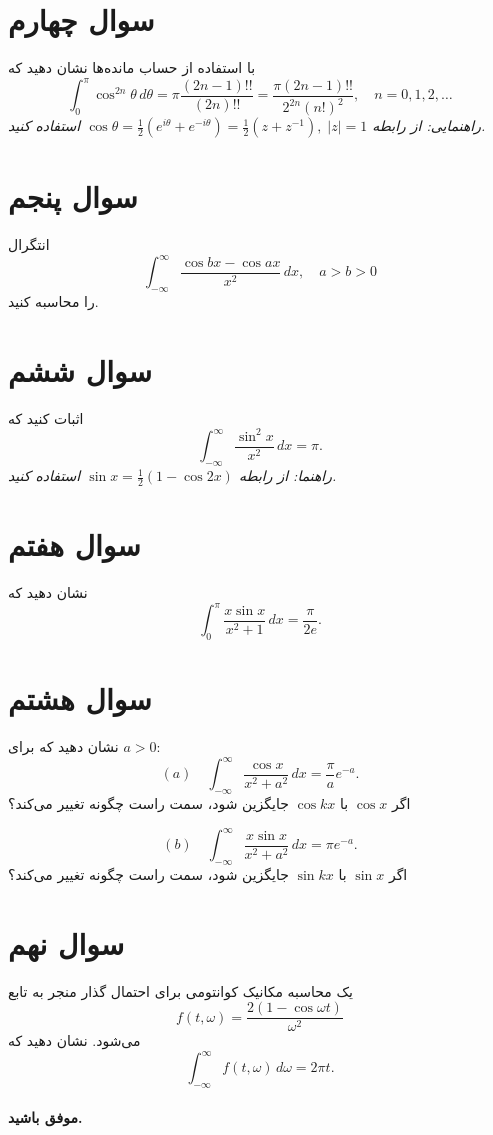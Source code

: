 \documentclass[a4paper,16pt]{article}
\begin{document}
	\section{سوال چهارم}
	
	با استفاده از حساب مانده‌ها نشان دهید که
	\[
	\int_0^\pi \cos^{2n} \theta\, d\theta = \pi \frac{(2n-1)!!}{(2n)!!} = \frac{\pi (2n-1)!!}{2^{2n} (n!)^2}, \quad n = 0,1,2,\dots
	\]  
	\textit{راهنمایی: از رابطه \(\cos \theta = \frac{1}{2}(e^{i\theta} + e^{-i\theta}) = \frac{1}{2}(z + z^{-1}), \; |z|=1\) استفاده کنید.}
	\section{سوال پنجم}
	انتگرال
	\[
	\int_{-\infty}^{\infty} \frac{\cos bx - \cos ax}{x^2}\, dx, \quad a > b > 0
	\]  
	را محاسبه کنید.  
	
	\section{سوال ششم}
	اثبات کنید که
	\[
	\int_{-\infty}^{\infty} \frac{\sin^2 x}{x^2}\, dx = \pi.
	\]  
	\textit{راهنما: از رابطه \(\sin x = \frac{1}{2}(1 - \cos 2x)\) استفاده کنید.}
	
	
	\section{سوال هفتم}
	نشان دهید که
	\[
	\int_0^\pi \frac{x \sin x}{x^2 + 1}\, dx = \frac{\pi}{2e}.
	\]
	
	\section{سوال هشتم}
نشان دهید که برای \(a>0\):
\[
(a)\quad \int_{-\infty}^{\infty} \frac{\cos x}{x^2 + a^2}\, dx = \frac{\pi}{a} e^{-a}.
\]  
اگر \(\cos x\) با \(\cos kx\) جایگزین شود، سمت راست چگونه تغییر می‌کند؟

\[
(b)\quad \int_{-\infty}^{\infty} \frac{x \sin x}{x^2 + a^2}\, dx = \pi e^{-a}.
\]  
اگر \(\sin x\) با \(\sin kx\) جایگزین شود، سمت راست چگونه تغییر می‌کند؟
	
	\section{سوال نهم}
	
	یک محاسبه مکانیک کوانتومی برای احتمال گذار منجر به تابع
	\[
	f(t,\omega) = \frac{2(1 - \cos \omega t)}{\omega^2}
	\]  
	می‌شود. نشان دهید که
	\[
	\int_{-\infty}^{\infty} f(t,\omega)\, d\omega = 2\pi t.
	\]
	\\
	\vspace{10pt}
	\textbf{موفق باشید.}
\end{document}
